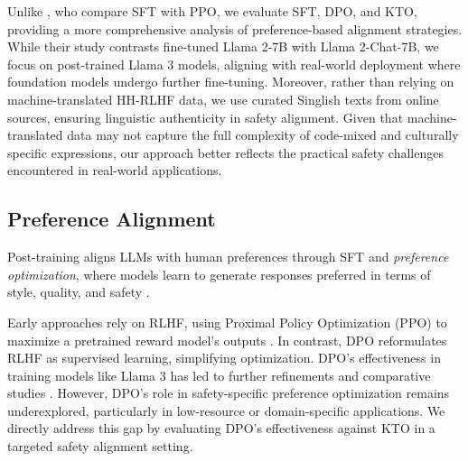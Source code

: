 Unlike \citet{shen2024languagebarrierdissectingsafety}, who compare SFT with PPO, we evaluate SFT, DPO, and KTO, providing a more comprehensive analysis of preference-based alignment strategies. While their study contrasts fine-tuned Llama 2-7B with Llama 2-Chat-7B, we focus on post-trained Llama 3 models, aligning with real-world deployment where foundation models undergo further fine-tuning. Moreover, rather than relying on machine-translated HH-RLHF data, we use curated Singlish texts from online sources, ensuring linguistic authenticity in safety alignment. Given that machine-translated data may not capture the full complexity of code-mixed and culturally specific expressions, our approach better reflects the practical safety challenges encountered in real-world applications.


\subsection{Preference Alignment}
\label{sec:pref_align}
Post-training aligns LLMs with human preferences through SFT and \textit{preference optimization}, where models learn to generate responses preferred in terms of style, quality, and safety \citep{ziegler2020finetuninglanguagemodelshuman, bai2022traininghelpfulharmlessassistant}.

Early approaches rely on RLHF, using Proximal Policy Optimization (PPO) to maximize a pretrained reward model’s outputs \citep{ziegler2020finetuninglanguagemodelshuman, ouyang2022traininglanguagemodelsfollow, bai2022traininghelpfulharmlessassistant}. In contrast, DPO \citep{rafailov2024directpreferenceoptimizationlanguage} reformulates RLHF as supervised learning, simplifying optimization. DPO’s effectiveness in training models like Llama 3 \citep{grattafiori2024llama3herdmodels} has led to further refinements \citep{pang2024iterativereasoningpreferenceoptimization, ethayarajh2024ktomodelalignmentprospect, xu2024contrastivepreferenceoptimizationpushing, azar2023generaltheoreticalparadigmunderstand} and comparative studies \citep{xu2024dposuperiorppollm}. However, DPO's role in safety-specific preference optimization remains underexplored, particularly in low-resource or domain-specific applications. We directly address this gap by evaluating DPO’s effectiveness against KTO in a targeted safety alignment setting.